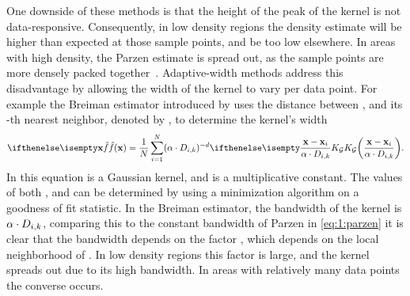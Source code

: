 	One downside of these methods is that the height of the peak of the kernel is not data-responsive. Consequently, in low density regions the density estimate will be higher than expected at those sample points, and be too low elsewhere. In areas with high density, the Parzen estimate is spread out, as the sample points are more densely packed together~\cite{breiman1977variable}. Adaptive-width methods address this disadvantage by allowing the width of the kernel to vary per data point. For example the Breiman estimator introduced by \textcite{breiman1977variable} uses the distance between \varPattern[\itXis], and its \KNNK-th nearest neighbor, denoted by \varKNNDistance{\itXis}{\KNNK}, to determine the kernel's width
	\begin{equation}\label{eq:1:BML}
	 	\varEstimatedDensityFunction{\varPattern} = \frac{1}{\varNumPatterns} \sum_{\itXis = 1}^{\varNumPatterns} (\varBMLconstant \cdot \varKNNDistance{\itXis}{k})^{-\varDim} \varKernel[\varGaussian]{\frac{\varPattern - \varPattern[\itXis]}{\varBMLconstant \cdot \varKNNDistance{\itXis}{k}}}.
	\end{equation}
	In this equation \varKernel[\varGaussian]{} is a Gaussian kernel, and \varBMLconstant is a multiplicative constant. The values of both \varBMLconstant, and \KNNK can be determined by using a minimization algorithm on a goodness of fit statistic. In the Breiman estimator, the bandwidth of the kernel is $\alpha \cdot D_{i, k}$, comparing this to the constant bandwidth \varBandwidth of Parzen in \cref{eq:1:parzen} it is clear that the bandwidth depends on the factor \varKNNDistance{\itXis}{\KNNK}, which depends on the local neighborhood of \varPattern[\itXis]. In low density regions this factor is large, and the kernel spreads out due to its high bandwidth. In areas with relatively many data points the converse occurs.

